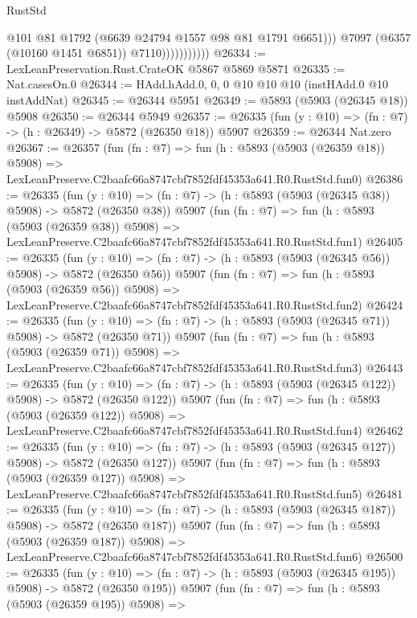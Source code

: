\begin{lexlean}{RustStd}
\begin{coremodule}
                              @101
                              @81
                              @1792
                              (@6639 @24794 @1557 @98 @81 @1791 @6651)))
                          @7097
                          (@6357 (@10160 @1451 @6851))
                          @7110)))))))))))
@26334 := LexLeanPreservation.Rust.CrateOK @5867 @5869 @5871
@26335 := Nat.casesOn.{0}
@26344 := HAdd.hAdd.{0, 0, 0} @10 @10 @10 (instHAdd.{0} @10 instAddNat)
@26345 := @26344 @5951
@26349 := @5893 (@5903 (@26345 @18)) @5908
@26350 := @26344 @5949
@26357 := @26335 (fun (y : @10) => (fn : @7) -> (h : @26349) -> @5872 (@26350 @18)) @5907
@26359 := @26344 Nat.zero
@26367 := @26357
    (fun (fn : @7) =>
    fun (h : @5893 (@5903 (@26359 @18)) @5908) =>
    LexLeanPreserve.C2baafc66a8747cbf7852fdf45353a641.R0.RustStd.fun0)
@26386 := @26335
    (fun (y : @10) => (fn : @7) -> (h : @5893 (@5903 (@26345 @38)) @5908) -> @5872 (@26350 @38))
    @5907
    (fun (fn : @7) =>
    fun (h : @5893 (@5903 (@26359 @38)) @5908) =>
    LexLeanPreserve.C2baafc66a8747cbf7852fdf45353a641.R0.RustStd.fun1)
@26405 := @26335
    (fun (y : @10) => (fn : @7) -> (h : @5893 (@5903 (@26345 @56)) @5908) -> @5872 (@26350 @56))
    @5907
    (fun (fn : @7) =>
    fun (h : @5893 (@5903 (@26359 @56)) @5908) =>
    LexLeanPreserve.C2baafc66a8747cbf7852fdf45353a641.R0.RustStd.fun2)
@26424 := @26335
    (fun (y : @10) => (fn : @7) -> (h : @5893 (@5903 (@26345 @71)) @5908) -> @5872 (@26350 @71))
    @5907
    (fun (fn : @7) =>
    fun (h : @5893 (@5903 (@26359 @71)) @5908) =>
    LexLeanPreserve.C2baafc66a8747cbf7852fdf45353a641.R0.RustStd.fun3)
@26443 := @26335
    (fun (y : @10) => (fn : @7) -> (h : @5893 (@5903 (@26345 @122)) @5908) -> @5872 (@26350 @122))
    @5907
    (fun (fn : @7) =>
    fun (h : @5893 (@5903 (@26359 @122)) @5908) =>
    LexLeanPreserve.C2baafc66a8747cbf7852fdf45353a641.R0.RustStd.fun4)
@26462 := @26335
    (fun (y : @10) => (fn : @7) -> (h : @5893 (@5903 (@26345 @127)) @5908) -> @5872 (@26350 @127))
    @5907
    (fun (fn : @7) =>
    fun (h : @5893 (@5903 (@26359 @127)) @5908) =>
    LexLeanPreserve.C2baafc66a8747cbf7852fdf45353a641.R0.RustStd.fun5)
@26481 := @26335
    (fun (y : @10) => (fn : @7) -> (h : @5893 (@5903 (@26345 @187)) @5908) -> @5872 (@26350 @187))
    @5907
    (fun (fn : @7) =>
    fun (h : @5893 (@5903 (@26359 @187)) @5908) =>
    LexLeanPreserve.C2baafc66a8747cbf7852fdf45353a641.R0.RustStd.fun6)
@26500 := @26335
    (fun (y : @10) => (fn : @7) -> (h : @5893 (@5903 (@26345 @195)) @5908) -> @5872 (@26350 @195))
    @5907
    (fun (fn : @7) =>
    fun (h : @5893 (@5903 (@26359 @195)) @5908) =>

\end{coremodule}
\end{lexlean}
